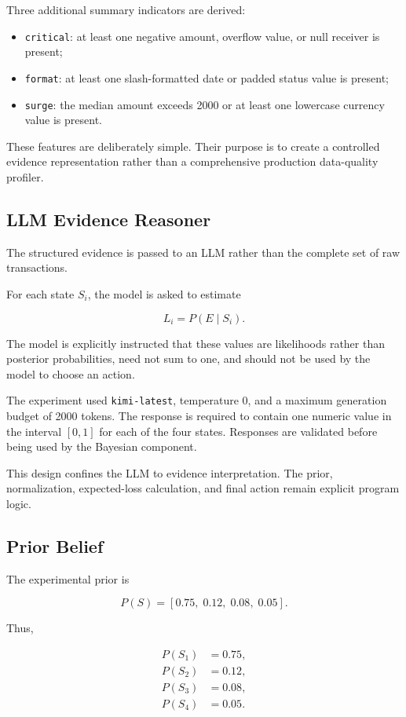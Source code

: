 \documentclass{article}
\begin{document}
Three additional summary indicators are derived:

\begin{itemize}
    \item \texttt{critical}: at least one negative amount, overflow value,
    or null receiver is present;
    \item \texttt{format}: at least one slash-formatted date or padded
    status value is present;
    \item \texttt{surge}: the median amount exceeds 2000 or at least one
    lowercase currency value is present.
\end{itemize}

These features are deliberately simple. Their purpose is to create a controlled evidence representation rather than a comprehensive production data-quality profiler.


\subsection{LLM Evidence Reasoner}

The structured evidence is passed to an LLM rather than the complete set of raw transactions.

For each state \(S_i\), the model is asked to estimate

\[
L_i=P(E\mid S_i).
\]

The model is explicitly instructed that these values are likelihoods rather than posterior probabilities, need not sum to one, and should not be used by the model to choose an action.

The experiment used \texttt{kimi-latest}, temperature 0, and a maximum generation budget of 2000 tokens. The response is required to contain one numeric value in the interval \([0,1]\) for each of the four states. Responses are validated before being used by the Bayesian component.

This design confines the LLM to evidence interpretation. The prior, normalization, expected-loss calculation, and final action remain explicit program logic.


\subsection{Prior Belief}

The experimental prior is

\[
P(S)
=
[0.75,\;0.12,\;0.08,\;0.05].
\]

Thus,

\begin{align*}
P(S_1)&=0.75,\\
P(S_2)&=0.12,\\
P(S_3)&=0.08,\\
P(S_4)&=0.05.
\end{align*}
\end{document}
